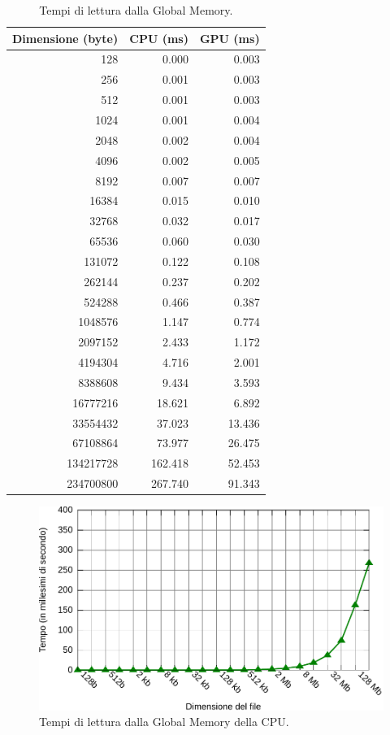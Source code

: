 \documentclass[12pt,a4paper,oneside]{book}
\begin{document}
\begin{table}[p]
\begin{center}
\begin{tabular}{|r|r|r|}
\hline
\textbf{Dimensione (byte)} & \textbf{CPU (ms)} & \textbf{GPU (ms)} \\
\hline
128 & 0.000 & 0.003 \\
\hline
256 & 0.001 & 0.003 \\
\hline
512 & 0.001 & 0.003 \\
\hline
1024 & 0.001 & 0.004 \\
\hline
2048 & 0.002 & 0.004 \\
\hline
4096 & 0.002 & 0.005 \\
\hline
8192 & 0.007 & 0.007 \\
\hline
16384 & 0.015 & 0.010 \\
\hline
32768 & 0.032 & 0.017 \\
\hline
65536 & 0.060 & 0.030 \\
\hline
131072 & 0.122 & 0.108 \\
\hline
262144 & 0.237 & 0.202 \\
\hline
524288 & 0.466 & 0.387 \\
\hline
1048576 & 1.147 & 0.774 \\
\hline
2097152 & 2.433 & 1.172 \\
\hline
4194304 & 4.716 & 2.001 \\
\hline
8388608 & 9.434 & 3.593 \\
\hline
16777216 & 18.621 & 6.892 \\
\hline
33554432 & 37.023 & 13.436 \\
\hline
67108864 & 73.977 & 26.475 \\
\hline
134217728 & 162.418 & 52.453 \\
\hline
234700800 & 267.740 & 91.343 \\
\hline
\end{tabular}
\caption{Tempi di lettura dalla Global Memory.\label{tab:test-read}}
\end{center}
\end{table}

\begin{figure}[p]
\begin{center}
\includegraphics[width=\textwidth]{img/test-read-cpu}
\caption{Tempi di lettura dalla Global Memory della CPU.\label{fig:test-read-cpu}}
\end{center}
\end{figure}
\end{document}
